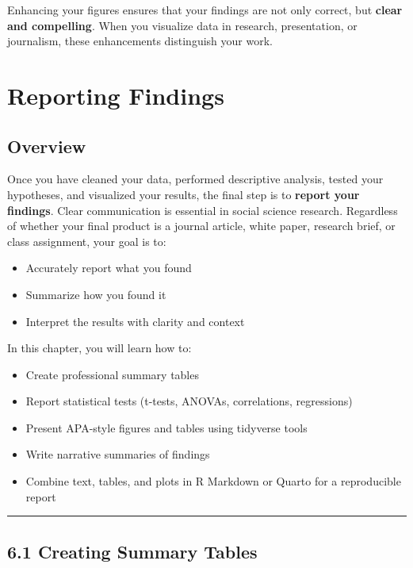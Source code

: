 \documentclass[
]{book}
\providecommand{\tightlist}{%
  \setlength{\itemsep}{0pt}\setlength{\parskip}{0pt}}
\begin{document}
Enhancing your figures ensures that your findings are not only correct, but \textbf{clear and compelling}. When you visualize data in research, presentation, or journalism, these enhancements distinguish your work.

\chapter{Reporting Findings}\label{reporting-findings}

\section{Overview}\label{overview-4}

Once you have cleaned your data, performed descriptive analysis, tested your hypotheses, and visualized your results, the final step is to \textbf{report your findings}. Clear communication is essential in social science research. Regardless of whether your final product is a journal article, white paper, research brief, or class assignment, your goal is to:

\begin{itemize}
\tightlist
\item
  Accurately report what you found
\item
  Summarize how you found it
\item
  Interpret the results with clarity and context
\end{itemize}

In this chapter, you will learn how to:

\begin{itemize}
\tightlist
\item
  Create professional summary tables
\item
  Report statistical tests (t-tests, ANOVAs, correlations, regressions)
\item
  Present APA-style figures and tables using tidyverse tools
\item
  Write narrative summaries of findings
\item
  Combine text, tables, and plots in R Markdown or Quarto for a reproducible report
\end{itemize}

\begin{center}\rule{0.5\linewidth}{0.5pt}\end{center}

\section{6.1 Creating Summary Tables}\label{creating-summary-tables}
\end{document}
